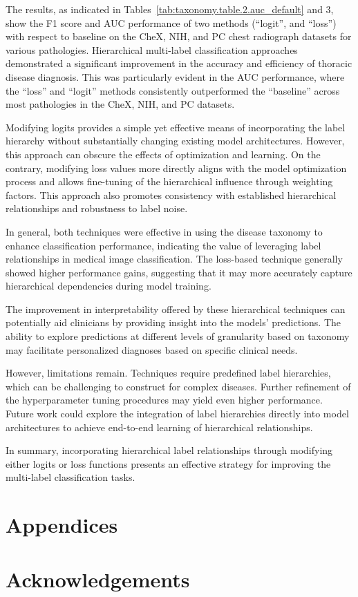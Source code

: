 The results, as indicated in Tables~\ref{tab:taxonomy.table.2.auc_default} and 3, show the F1 score and AUC performance of two methods (``logit'', and ``loss'') with respect to baseline on the CheX, NIH, and PC chest radiograph datasets for various pathologies. Hierarchical multi-label classification approaches demonstrated a significant improvement in the accuracy and efficiency of thoracic disease diagnosis. This was particularly evident in the AUC performance, where the ``loss'' and ``logit'' methods consistently outperformed the ``baseline'' across most pathologies in the CheX, NIH, and PC datasets.

Modifying logits provides a simple yet effective means of incorporating the label hierarchy without substantially changing existing model architectures. However, this approach can obscure the effects of optimization and learning. On the contrary, modifying loss values more directly aligns with the model optimization process and allows fine-tuning of the hierarchical influence through weighting factors. This approach also promotes consistency with established hierarchical relationships and robustness to label noise.

In general, both techniques were effective in using the disease taxonomy to enhance classification performance, indicating the value of leveraging label relationships in medical image classification. The loss-based technique generally showed higher performance gains, suggesting that it may more accurately capture hierarchical dependencies during model training.

The improvement in interpretability offered by these hierarchical techniques can potentially aid clinicians by providing insight into the models' predictions. The ability to explore predictions at different levels of granularity based on taxonomy may facilitate personalized diagnoses based on specific clinical needs.

However, limitations remain. Techniques require predefined label hierarchies, which can be challenging to construct for complex diseases. Further refinement of the hyperparameter tuning procedures may yield even higher performance. Future work could explore the integration of label hierarchies directly into model architectures to achieve end-to-end learning of hierarchical relationships.

In summary, incorporating hierarchical label relationships through modifying either logits or loss functions presents an effective strategy for improving the multi-label classification tasks.

\section*{Appendices}
\section*{Acknowledgements}

